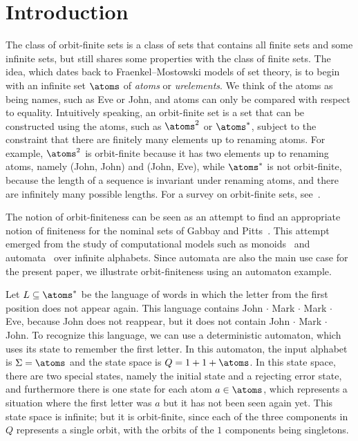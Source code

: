 \section{Introduction}
The class of orbit-finite sets is a class of sets that contains all finite sets and some infinite sets, but still shares some properties with the class of finite sets.  The idea, which dates back to Fraenkel--Mostowski models of set theory,  is to begin with an infinite set $\atoms$ of \emph{atoms} or \emph{urelements}. We think of the atoms as being names, such as Eve or John, and atoms can only be compared with respect to equality. Intuitively speaking, an  orbit-finite set is a set  that can be constructed using the atoms, such as $\atoms^2$ or $\atoms^*$, subject to the constraint that there are finitely many elements up to  renaming atoms. For example, $\atoms^2$ is orbit-finite because it has two elements up to renaming atoms, namely (John, John) and (John, Eve), while $\atoms^*$ is not orbit-finite, because the length of a sequence is invariant under renaming atoms, and there are infinitely many possible lengths. For a survey on orbit-finite sets, see~\cite{bojanczyk_slightly2018}.

The notion of orbit-finiteness can be seen as an attempt to find an appropriate notion of finiteness for the  nominal sets of Gabbay and Pitts~\cite{PittsAM:nomsns}.  This attempt emerged from the study of computational models such as monoids~\cite{bojanczykNominalMonoids2013} and automata~\cite{bojanczykAutomataTheoryNominal2014} over infinite alphabets. Since automata are also the main use case for the present paper, we illustrate orbit-finiteness using an automaton example. 

\begin{example}\label{ex:first-letter-repeats}
    Let  $L \subseteq \atoms^*$ be the language of  words in which the letter from the first position does not appear again. This language contains John $\cdot$ Mark $\cdot$ Mark $\cdot$ Eve, because John does not reappear, but it does not contain John $\cdot$ Mark $\cdot$ John. To recognize this language, we can use a deterministic automaton, which uses its state to remember the first letter. In this automaton, the input alphabet is $\Sigma = \atoms$ and  the state space is $Q = 1 + 1 + \atoms$. In this state space, there are two special states, namely the initial state and a rejecting error state, and furthermore there is one state for each atom $a \in \atoms$, which represents a situation where the first letter was $a$ but it has not been seen again yet. This state space is infinite; but it is orbit-finite, since each of the three components in $Q$ represents a single orbit, with the orbits of the $1$ components being singletons.\exampleend
\end{example}

